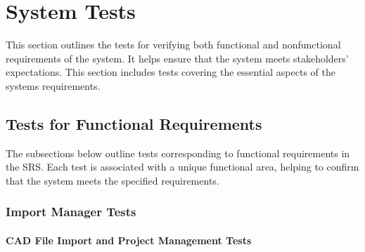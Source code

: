 \documentclass[12pt, titlepage]{article}
\begin{document}


\section{System Tests}

This section outlines the tests for verifying both functional and nonfunctional requirements of the system. It helps ensure that the system meets stakeholders' expectations. This section includes
tests covering the essential aspects of the systems requirements.

\subsection{Tests for Functional Requirements}

The subsections below outline tests corresponding to functional requirements in the SRS.
Each test is associated with a unique functional area, helping to confirm that the system meets
the specified requirements. 

\subsubsection{Import Manager Tests}

\paragraph{CAD File Import and Project Management Tests}
\end{document}
